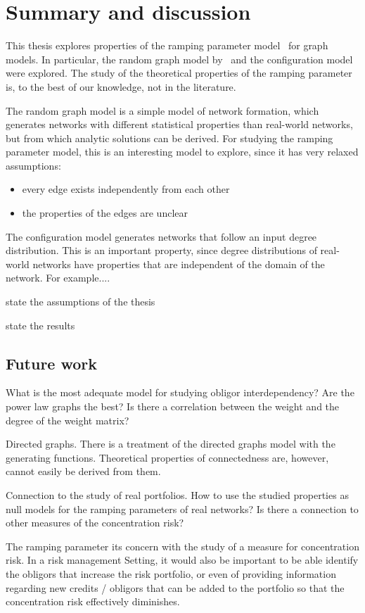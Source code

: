 \chapter{Summary and discussion} %
\label{cha:discussion}

This thesis explores properties of the ramping parameter model~\cite{Sindel:2009} for graph models.
In particular, the random graph model by~\cite{} and the configuration model were explored.
The study of the theoretical properties of the ramping parameter is, to the best of our knowledge, not in the literature.


The random graph model is a simple model of network formation, which generates networks with different statistical properties than real-world networks, but from which analytic solutions can be derived.
For studying the ramping parameter model, this is an interesting model to explore, since it has very relaxed assumptions:
\begin{itemize}
\item every edge exists independently from each other
\item the properties of the edges are unclear
\end{itemize}

The configuration model generates networks that follow an input degree distribution.
This is an important property, since degree distributions of real-world networks have properties that are independent of the domain of the network.
For example....



state the assumptions of the thesis

state the results


\section{Future work}
\label{sec:future_work}

What is the most adequate model for studying obligor interdependency?
Are the power law graphs the best?
Is there a correlation between the weight and the degree of the weight matrix?


Directed graphs.
There is a treatment of the directed graphs model with the generating functions.
Theoretical properties of connectedness are, however, cannot easily be derived from them.



Connection to the study of real portfolios.
How to use the studied properties as null models for the ramping parameters of real networks?
Is there a connection to other measures of the concentration risk?


The ramping parameter its concern with the study of a measure for concentration risk.
In a risk management Setting, it would also be important to be able identify the obligors that increase the risk portfolio, or even of providing information regarding new credits / obligors that can be added to the portfolio so that the concentration risk effectively diminishes.



